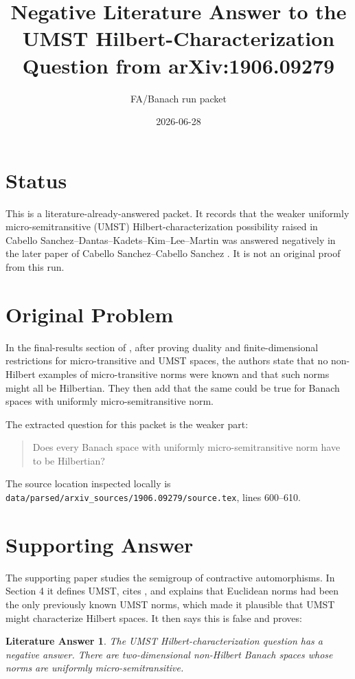 \documentclass[11pt]{article}
\title{Negative Literature Answer to the UMST Hilbert-Characterization Question from arXiv:1906.09279}
\author{FA/Banach run packet}
\date{2026-06-28}
\newtheorem*{theorem}{Literature Answer}
\begin{document}
\maketitle

\section*{Status}

This is a literature-already-answered packet. It records that the weaker
uniformly micro-semitransitive (UMST) Hilbert-characterization possibility
raised in Cabello Sanchez--Dantas--Kadets--Kim--Lee--Martin \cite{CDKKLM}
was answered negatively in the later paper of Cabello Sanchez--Cabello Sanchez
\cite{CC}. It is not an original proof from this run.

\section*{Original Problem}

In the final-results section of \cite{CDKKLM}, after proving duality and
finite-dimensional restrictions for micro-transitive and UMST spaces, the
authors state that no non-Hilbert examples of micro-transitive norms were
known and that such norms might all be Hilbertian. They then add that the same
could be true for Banach spaces with uniformly micro-semitransitive norm.

The extracted question for this packet is the weaker part:

\begin{quote}
Does every Banach space with uniformly micro-semitransitive norm have to be
Hilbertian?
\end{quote}

The source location inspected locally is
\texttt{data/parsed/arxiv\_sources/1906.09279/source.tex}, lines 600--610.

\section*{Supporting Answer}

The supporting paper \cite{CC} studies the semigroup of contractive
automorphisms. In Section 4 it defines UMST, cites \cite{CDKKLM}, and explains
that Euclidean norms had been the only previously known UMST norms, which made
it plausible that UMST might characterize Hilbert spaces. It then says this is
false and proves:

\begin{theorem}
The UMST Hilbert-characterization question has a negative answer. There are
two-dimensional non-Hilbert Banach spaces whose norms are uniformly
micro-semitransitive.
\end{theorem}
\end{document}
